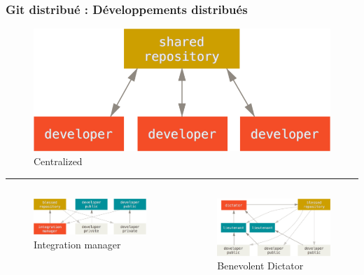 \documentclass[table,tikz,12pt,svgnames]{beamer}
\begin{document}
\begin{frame}
\frametitle{Git distribué : Développements distribués}

\begin{figure}
	\centering
	\includegraphics[scale=0.3]{images/centralized_workflow-trim.png}\\
	\small Centralized
\end{figure}

\vspace{-1em}
\color{gray}\rule{\linewidth}{2pt}

\begin{adjustwidth}{-2cm}{-1cm}{}
	\begin{columns}[T] %
		\begin{column}{.5\textwidth}
			\begin{figure}
				\includegraphics[scale=0.22]{images/integration-manager-trim.png}
				\small {Integration manager}
			\end{figure}
		\end{column}%
		\begin{column}{.6\textwidth}
			\vspace{-0.35em}
			\begin{figure}
				\hfill%
				\includegraphics[scale=0.23]{images/benevolent-dictator-trim.png}
				Benevolent Dictator
			\end{figure}
		\end{column}%
	\end{columns}
\end{adjustwidth}
\end{frame}
\end{document}
